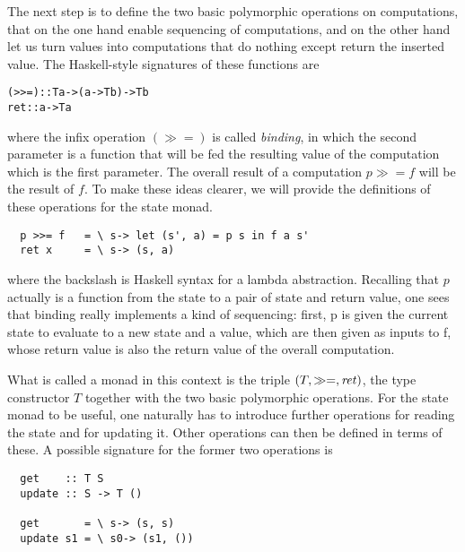The next step is to define the two basic polymorphic operations on computations,
that on the one hand enable sequencing of computations, and on the other hand
let us turn values into computations that do nothing except return the inserted
value. The Haskell-style signatures of these functions are
\begin{alltt}
  (>>=) :: T a -> (a -> T b) -> T b
  ret   :: a -> T a
\end{alltt}
where the infix operation $(\gg=)$ is called \emph{binding}, in which the second
parameter is a function that will be fed the resulting value of the computation
which is the first parameter. The overall result of a computation $p \gg= f$ will
be the result of $f$. To make these ideas clearer, we will provide the definitions
of these operations for the state monad.
\begin{verbatim}
  p >>= f   = \ s-> let (s', a) = p s in f a s'
  ret x     = \ s-> (s, a)
\end{verbatim}
where the backslash is Haskell syntax for a lambda abstraction. Recalling that $p$
actually is a function from the state to a pair of state and return value, one
sees that binding really implements a kind of sequencing: first, p is given the
current state to evaluate to a new state and a value, which are then given as
inputs to f, whose return value is also the return value of the overall
computation.

What is called a monad in this context is the triple $(T, \gg=, \mathit{ret})$, \IE the
type constructor $T$ together with the two basic polymorphic operations. For the
state monad to be useful, one naturally has to introduce further operations for
reading the state and for updating it. Other operations can then be defined in
terms of these. A possible signature for the former two operations is
\begin{verbatim}
  get    :: T S
  update :: S -> T ()
 
  get       = \ s-> (s, s)
  update s1 = \ s0-> (s1, ())
\end{verbatim}

